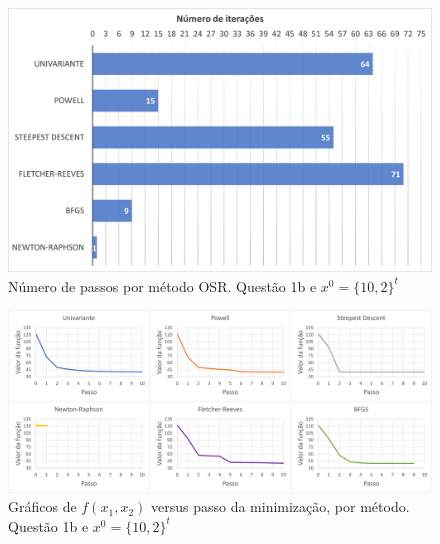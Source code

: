\documentclass[10pt, a4paper]{article}
\begin{document}
\begin{figure}[H]
  \centering
  \includegraphics[scale=0.4]{figuras/q1b_passos_P1.PNG}
  \caption{Número de passos por método OSR. Questão 1b e $x^0 = \{10,2\}^t$ }
\end{figure}

\begin{figure}[H]
  \centering
  \includegraphics[scale=0.45]{figuras/q1b_fxpassos_P1.PNG}
  \caption{Gráficos de $f(x_1,x_2)$ versus passo da minimização, por método. Questão 1b e $x^0 = \{10,2\}^t$}
\end{figure}
\end{document}
